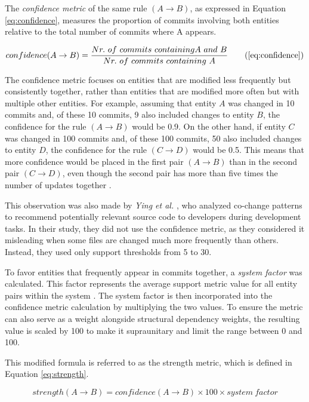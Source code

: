 The \textit{confidence metric} of the same rule $(A \rightarrow B)$, as expressed in Equation \eqref{eq:confidence}, measures the proportion of commits involving both entities relative to the total number of commits where A appears.

\[
\text{$confidence$}(A \rightarrow B) = \frac{\text{$Nr.\ of\ commits\ containing$} A \text{ $and$ } B}{\text{$Nr.\ of\ commits\ containing$ } A}
\tag{\ref{eq:confidence}}
\]



The confidence metric focuses on entities that are modified less frequently but consistently together, rather than entities that are modified more often but with multiple other entities. For example, assuming that entity \( A \) was changed in 10 commits and, of these 10 commits, 9 also included changes to entity \( B \), the confidence for the rule \( (A \rightarrow B) \) would be 0.9. On the other hand, if entity \( C \) was changed in 100 commits and, of these 100 commits, 50 also included changes to entity \( D \), the confidence for the rule \( (C \rightarrow D) \) would be 0.5. This means that more confidence would be placed in the first pair \( (A \rightarrow B) \) than in the second pair \( (C \rightarrow D) \), even though the second pair has more than five times the number of updates together \cite{cluster-access}.


This observation was also made by \textit{Ying et al.} \cite{Ying-co-change}, who analyzed co-change patterns to recommend potentially relevant source code to developers during development tasks. In their study, they did not use the confidence metric, as they considered it misleading when some files are changed much more frequently than others. Instead, they used only support thresholds from 5 to 30.
 

To favor entities that frequently appear in commits together, a \textit{system factor} was calculated. This factor represents the average support metric value for all entity pairs within the system \cite{cluster-access, b4}. The system factor is then incorporated into the confidence metric calculation by multiplying the two values. To ensure the metric can also serve as a weight alongside structural dependency weights, the resulting value is scaled by 100 to make it supraunitary and limit the range between 0 and 100.

This modified formula is referred to as the strength metric, which is defined in Equation \eqref{eq:strength}.

\begin{equation}
\text{$strength$}(A \rightarrow B) = \text{$confidence$}(A \rightarrow B) \times 100 \times \text{$system\ factor$}
\label{eq:strength}
\end{equation}



